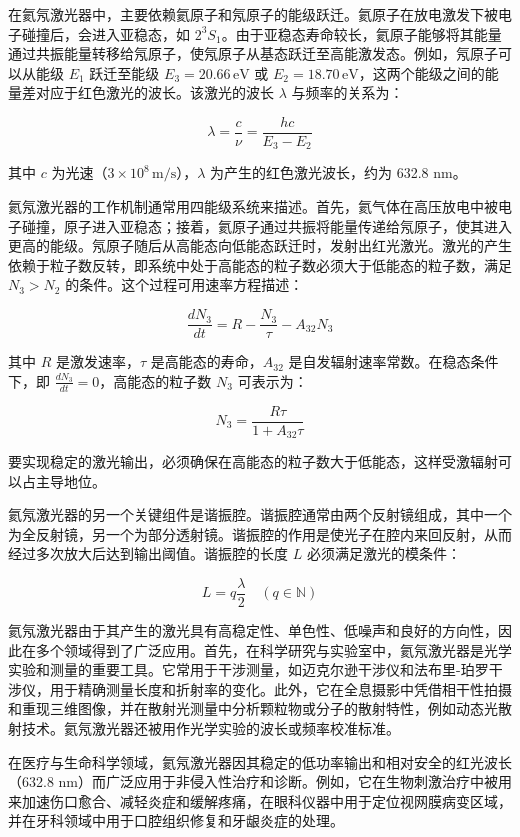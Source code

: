 在氦氖激光器中，主要依赖氦原子和氖原子的能级跃迁。氦原子在放电激发下被电子碰撞后，会进入亚稳态，如 \(2^3S_1\)。由于亚稳态寿命较长，氦原子能够将其能量通过共振能量转移给氖原子，使氖原子从基态跃迁至高能激发态。例如，氖原子可以从能级 \(E_1\) 跃迁至能级 \(E_3 = 20.66 \, \text{eV}\) 或 \(E_2 = 18.70 \, \text{eV}\)，这两个能级之间的能量差对应于红色激光的波长。该激光的波长 \(\lambda\) 与频率的关系为：

\[
\lambda = \frac{c}{\nu} = \frac{hc}{E_3 - E_2}
\]

其中 \(c\) 为光速（\(3 \times 10^8 \, \text{m/s}\)），\(\lambda\) 为产生的红色激光波长，约为 632.8 nm。

氦氖激光器的工作机制通常用四能级系统来描述。首先，氦气体在高压放电中被电子碰撞，原子进入亚稳态；接着，氦原子通过共振将能量传递给氖原子，使其进入更高的能级。氖原子随后从高能态向低能态跃迁时，发射出红光激光。激光的产生依赖于粒子数反转，即系统中处于高能态的粒子数必须大于低能态的粒子数，满足 \(N_3 > N_2\) 的条件。这个过程可用速率方程描述：

\[
\frac{dN_3}{dt} = R - \frac{N_3}{\tau} - A_{32} N_3
\]

其中 \(R\) 是激发速率，\(\tau\) 是高能态的寿命，\(A_{32}\) 是自发辐射速率常数。在稳态条件下，即 \(\frac{dN_3}{dt} = 0\)，高能态的粒子数 \(N_3\) 可表示为：

\[
N_3 = \frac{R \tau}{1 + A_{32} \tau}
\]

要实现稳定的激光输出，必须确保在高能态的粒子数大于低能态，这样受激辐射可以占主导地位。

氦氖激光器的另一个关键组件是谐振腔。谐振腔通常由两个反射镜组成，其中一个为全反射镜，另一个为部分透射镜。谐振腔的作用是使光子在腔内来回反射，从而经过多次放大后达到输出阈值。谐振腔的长度 \(L\) 必须满足激光的模条件：

\[
L = q \frac{\lambda}{2} \quad (q \in \mathbb{N})
\]

氦氖激光器由于其产生的激光具有高稳定性、单色性、低噪声和良好的方向性，因此在多个领域得到了广泛应用。首先，在科学研究与实验室中，氦氖激光器是光学实验和测量的重要工具。它常用于干涉测量，如迈克尔逊干涉仪和法布里-珀罗干涉仪，用于精确测量长度和折射率的变化。此外，它在全息摄影中凭借相干性拍摄和重现三维图像，并在散射光测量中分析颗粒物或分子的散射特性，例如动态光散射技术。氦氖激光器还被用作光学实验的波长或频率校准标准。 

在医疗与生命科学领域，氦氖激光器因其稳定的低功率输出和相对安全的红光波长（632.8 nm）而广泛应用于非侵入性治疗和诊断。例如，它在生物刺激治疗中被用来加速伤口愈合、减轻炎症和缓解疼痛，在眼科仪器中用于定位视网膜病变区域，并在牙科领域中用于口腔组织修复和牙龈炎症的处理。

